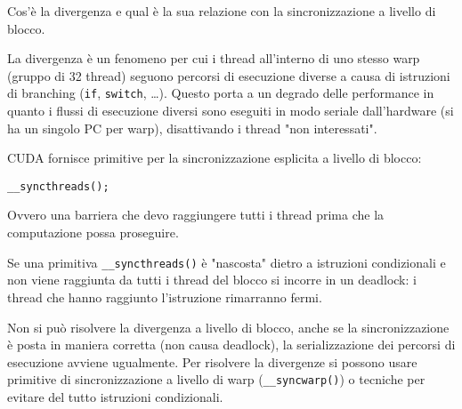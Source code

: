 \begin{questions}
    \question Cos'è la divergenza e qual è la sua relazione con la sincronizzazione a livello di blocco.
    
    \begin{solution}
        La divergenza è un fenomeno per cui i thread all'interno di uno stesso warp (gruppo di 32 thread) seguono percorsi di esecuzione diverse a causa di istruzioni di branching (\texttt{if}, \texttt{switch}, \dots). Questo porta a un degrado delle performance in quanto i flussi di esecuzione diversi sono eseguiti in modo seriale dall'hardware (si ha un singolo PC per warp), disattivando i thread "non interessati".
        
        CUDA fornisce primitive per la sincronizzazione esplicita a livello di blocco: 
        \begin{verbatim}
__syncthreads();
        \end{verbatim}
        Ovvero una barriera che devo raggiungere tutti i thread prima che la computazione possa proseguire.
        
        Se una primitiva \texttt{\_\_syncthreads()} è "nascosta" dietro a istruzioni condizionali e non viene raggiunta da tutti i thread del blocco si incorre in un deadlock: i thread che hanno raggiunto l'istruzione rimarranno fermi.
        
        Non si può risolvere la divergenza a livello di blocco, anche se la sincronizzazione è posta in maniera corretta (non causa deadlock), la serializzazione dei percorsi di esecuzione avviene ugualmente. Per risolvere la divergenze si possono usare primitive di sincronizzazione a livello di warp (\texttt{\_\_syncwarp()}) o tecniche per evitare del tutto istruzioni condizionali.
        
        
    \end{solution}
\end{questions}